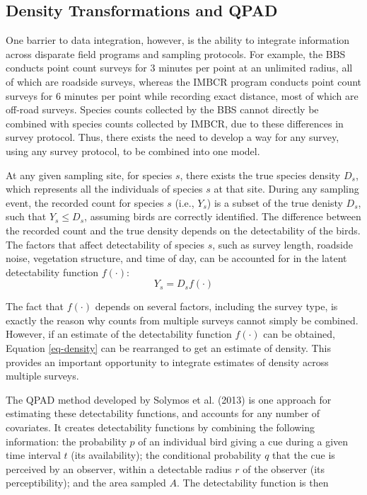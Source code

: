 \documentclass[]{article}
\begin{document}
\subsection{Density Transformations and QPAD}
One barrier to data integration, however, is the ability to integrate information across disparate field programs and sampling protocols. For example, the BBS conducts point count surveys for 3 minutes per point at an unlimited radius, all of which are roadside surveys, whereas the IMBCR program conducts point count surveys for 6 minutes per point while recording exact distance, most of which are off-road surveys. Species counts collected by the BBS cannot directly be combined with species counts collected by IMBCR, due to these differences in survey protocol. Thus, there exists the need to develop a way for any survey, using any survey protocol, to be combined into one model.

At any given sampling site, for species $s$, there exists the true species density $D_s$, which represents all the individuals of species $s$ at that site. During any sampling event, the recorded count for species $s$ (i.e., $Y_s$) is a subset of the true denisty $D_s$, such that $Y_s \leq D_s$, assuming birds are correctly identified. The difference between the recorded count and the true density depends on the detectability of the birds. The factors that affect detectability of species $s$, such as survey length, roadside noise, vegetation structure, and time of day, can be accounted for in the latent detectability function $f(\cdot)$:
\begin{equation}
	\label{eq-density}
	Y_s = D_s f(\cdot)
\end{equation}

The fact that $f(\cdot)$ depends on several factors, including the survey type, is exactly the reason why counts from multiple surveys cannot simply be combined. However, if an estimate of the detectability function $f(\cdot)$ can be obtained, Equation \ref{eq-density} can be rearranged to get an estimate of density. This provides an important opportunity to integrate estimates of density across multiple surveys.

The QPAD method developed by Solymos et al. (2013) is one approach for estimating these detectability functions, and accounts for any number of covariates. It creates detectability functions by combining the following information: the probability $p$ of an individual bird giving a cue during a given time interval $t$ (its availability); the conditional probability $q$ that the cue is perceived by an observer, within a detectable radius $r$ of the observer (its perceptibility); and the area sampled $A$. The detectability function is then
\end{document}
